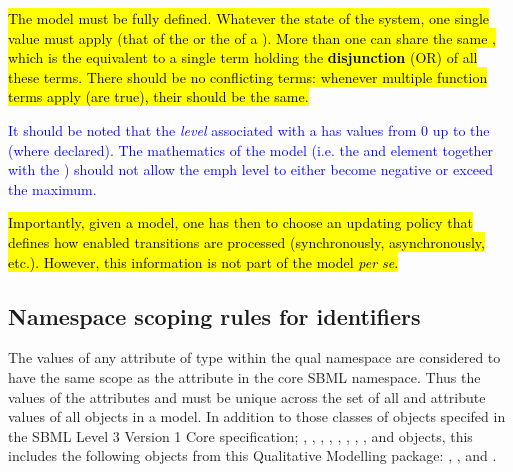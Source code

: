 \hl{The model must be fully defined. Whatever the state of the system, one single value must apply (that of the \DefaultTerm or the  of a \FunctionTerm). More than one \FunctionTerm can share the same , which is the equivalent to a single term holding the {\bf disjunction} (OR) of all these terms.  There should be no conflicting terms:  whenever multiple function terms apply (are true), their  should be the same. }

\textcolor{blue}{It should be noted that the \emph{level} associated with a \QualitativeSpecies has values from 0 up to the  (where declared). The mathematics of the model (i.e. the \FunctionTerm and \DefaultTerm element together with the ) should not allow the {emph} level to either become negative or exceed the maximum.}

\hl{Importantly, given a model, one has then to choose an updating policy that defines how enabled transitions are processed (synchronously, asynchronously, etc.). However, this information is not part of the model {\em per se}. }




\subsection{Namespace scoping rules for identifiers}
\label{sec:ns-id}

The values of any  attribute  of type  within the qual namespace are considered to have the same scope as the  attribute in the core SBML namespace. Thus the values of the attributes
   and  must be unique across the set of all  and
   attribute values of all objects in a model. In addition to those classes of objects specifed in the SBML Level 3 Version 1 Core specification;
  \Model, \FunctionDefinition, \Compartment,
  \Species, \Reaction, \SpeciesReference, \ModifierSpeciesReference,
  \Event, and \Parameter objects, this includes the following objects from this Qualitative Modelling package: \QualitativeSpecies, \Transition, 
  \Input and \Output.
